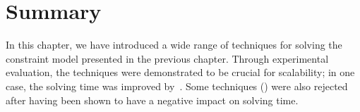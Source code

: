 \section{Summary}

In this chapter, we have introduced a wide range of techniques for solving the
\gls{constraint model} presented in the previous chapter.
%
Through experimental evaluation, the techniques were demonstrated to be crucial
for scalability; in one case, the solving time was improved
by~\printMaxSpeedup{%
  \SolvTechEnableOnlyAllGoodPrePlusSolvingTimeSpeedupPrePlusSolvingTimeZeroCenteredSpeedupMax,
  \SolvTechDisableAllBadPrePlusSolvingTimeSpeedupPrePlusSolvingTimeZeroCenteredSpeedupMax,
  \SolvTechDisableAllPrePlusSolvingTimeSpeedupPrePlusSolvingTimeZeroCenteredSpeedupMax
}.
%
Some techniques () were also rejected after having been shown to have
a negative impact on solving time.
